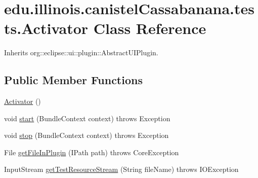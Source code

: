 \hypertarget{classedu_1_1illinois_1_1canistelCassabanana_1_1tests_1_1Activator}{
\section{edu.illinois.canistelCassabanana.tests.Activator Class Reference}
\label{classedu_1_1illinois_1_1canistelCassabanana_1_1tests_1_1Activator}
}


Inherits org::eclipse::ui::plugin::AbstractUIPlugin.

\subsection*{Public Member Functions}
\begin{DoxyCompactItemize}
\item 
\hyperlink{classedu_1_1illinois_1_1canistelCassabanana_1_1tests_1_1Activator_a4e5b18703f5c0385478360b07fe975b7}{Activator} ()
\item 
void \hyperlink{classedu_1_1illinois_1_1canistelCassabanana_1_1tests_1_1Activator_a13b3d0b1c4be89ab06a07f7818acb522}{start} (BundleContext context)  throws Exception 
\item 
void \hyperlink{classedu_1_1illinois_1_1canistelCassabanana_1_1tests_1_1Activator_a598115c8f6770f4a3ffb33b47168470c}{stop} (BundleContext context)  throws Exception 
\item 
File \hyperlink{classedu_1_1illinois_1_1canistelCassabanana_1_1tests_1_1Activator_af85bffd533d8e740c3d0e9f80495f6e0}{getFileInPlugin} (IPath path)  throws CoreException 
\item 
InputStream \hyperlink{classedu_1_1illinois_1_1canistelCassabanana_1_1tests_1_1Activator_abf0ef03f39787a96e7432ec4b94bf3c1}{getTestResourceStream} (String fileName)  throws IOException 
\end{DoxyCompactItemize}
